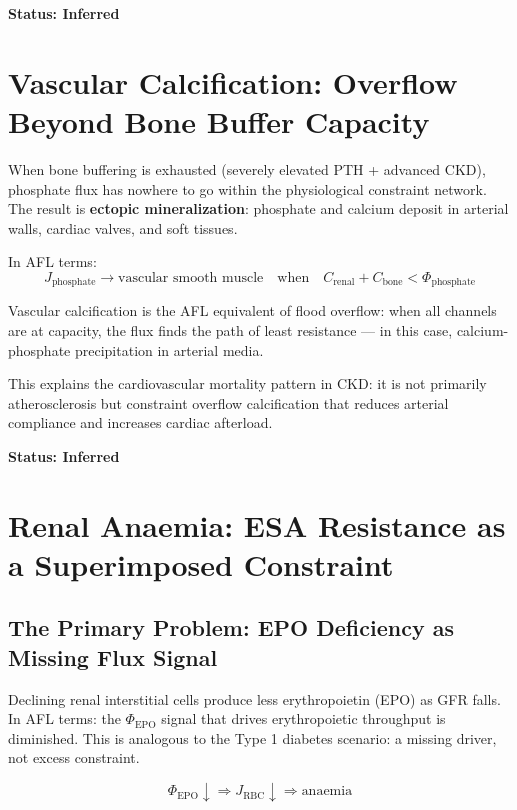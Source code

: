 \documentclass[12pt,a4paper]{article}
\begin{document}
\textbf{Status: Inferred}

\section{Vascular Calcification: Overflow Beyond Bone Buffer Capacity}

When bone buffering is exhausted (severely elevated PTH + advanced CKD), phosphate flux has nowhere to go within the physiological constraint network. The result is \textbf{ectopic mineralization}: phosphate and calcium deposit in arterial walls, cardiac valves, and soft tissues.

In AFL terms:
\begin{equation}
    J_{\mathrm{phosphate}} \to \text{vascular smooth muscle} \quad \text{when} \quad C_{\mathrm{renal}} + C_{\mathrm{bone}} < \Phi_{\mathrm{phosphate}}
\end{equation}

Vascular calcification is the AFL equivalent of flood overflow: when all channels are at capacity, the flux finds the path of least resistance --- in this case, calcium-phosphate precipitation in arterial media.

This explains the cardiovascular mortality pattern in CKD: it is not primarily atherosclerosis but constraint overflow calcification that reduces arterial compliance and increases cardiac afterload.

\textbf{Status: Inferred}

\section{Renal Anaemia: ESA Resistance as a Superimposed Constraint}

\subsection{The Primary Problem: EPO Deficiency as Missing Flux Signal}

Declining renal interstitial cells produce less erythropoietin (EPO) as GFR falls. In AFL terms: the $\Phi_{\mathrm{EPO}}$ signal that drives erythropoietic throughput is diminished. This is analogous to the Type 1 diabetes scenario: a missing driver, not excess constraint.

\begin{equation}
    \Phi_{\mathrm{EPO}} \downarrow \Rightarrow J_{\mathrm{RBC}} \downarrow \Rightarrow \text{anaemia}
\end{equation}
\end{document}
